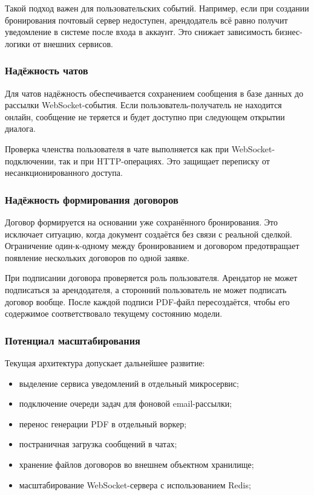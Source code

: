 Такой подход важен для пользовательских событий. Например, если при создании бронирования почтовый сервер недоступен, арендодатель всё равно получит уведомление в системе после входа в аккаунт. Это снижает зависимость бизнес-логики от внешних сервисов.

\subsubsection{Надёжность чатов}
Для чатов надёжность обеспечивается сохранением сообщения в базе данных до рассылки WebSocket-события. Если пользователь-получатель не находится онлайн, сообщение не теряется и будет доступно при следующем открытии диалога.

Проверка членства пользователя в чате выполняется как при WebSocket-подключении, так и при HTTP-операциях. Это защищает переписку от несанкционированного доступа.

\subsubsection{Надёжность формирования договоров}
Договор формируется на основании уже сохранённого бронирования. Это исключает ситуацию, когда документ создаётся без связи с реальной сделкой. Ограничение один-к-одному между бронированием и договором предотвращает появление нескольких договоров по одной заявке.

При подписании договора проверяется роль пользователя. Арендатор не может подписаться за арендодателя, а сторонний пользователь не может подписать договор вообще. После каждой подписи PDF-файл пересоздаётся, чтобы его содержимое соответствовало текущему состоянию модели.

\subsubsection{Потенциал масштабирования}
Текущая архитектура допускает дальнейшее развитие:
\begin{itemize}
    \item выделение сервиса уведомлений в отдельный микросервис;
    \item подключение очереди задач для фоновой email-рассылки;
    \item перенос генерации PDF в отдельный воркер;
    \item постраничная загрузка сообщений в чатах;
    \item хранение файлов договоров во внешнем объектном хранилище;
    \item масштабирование WebSocket-сервера с использованием Redis;
\end{itemize}

